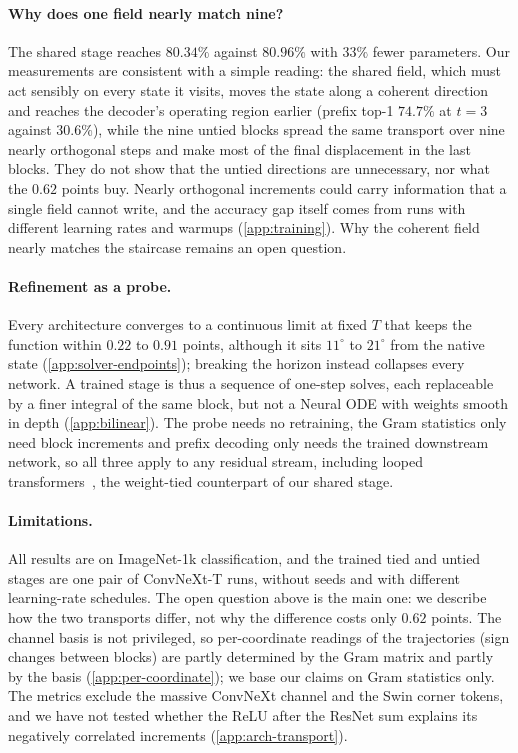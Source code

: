 \paragraph{Why does one field nearly match nine?}
The shared stage reaches $80.34\%$ against $80.96\%$ with $33\%$ fewer parameters.
Our measurements are consistent with a simple reading: the shared field, which must act
sensibly on every state it visits, moves the state along a coherent direction and
reaches the decoder's operating region earlier (prefix top-1 $74.7\%$ at $t{=}3$
against $30.6\%$), while the nine untied blocks spread the same transport over nine
nearly orthogonal steps and make most of the final displacement in the last blocks.
They do not show that the untied directions are unnecessary, nor what the $0.62$ points
buy.
Nearly orthogonal increments could carry information that a single field cannot
write, and the accuracy gap itself comes from runs with different learning rates and
warmups (\cref{app:training}).
Why the coherent field nearly matches the staircase remains an open question.

\paragraph{Refinement as a probe.}
Every architecture converges to a continuous limit at fixed $T$ that keeps the function
within $0.22$ to $0.91$ points, although it sits $11^\circ$ to $21^\circ$ from the native
state (\cref{app:solver-endpoints}); breaking the horizon instead collapses every
network.
A trained stage is thus a sequence of one-step solves, each replaceable by a finer
integral of the same block, but not a Neural ODE with weights smooth in depth
(\cref{app:bilinear}).
The probe needs no retraining, the Gram statistics only need block increments and prefix
decoding only needs the trained downstream network, so all three apply to any residual
stream, including looped transformers~\citep{dehghani2019universal,giannou2023looped},
the weight-tied counterpart of our shared stage.

\paragraph{Limitations.}
All results are on ImageNet-1k classification, and the trained tied and untied stages
are one pair of ConvNeXt-T runs, without seeds and with different learning-rate
schedules.
The open question above is the main one: we describe how the two transports differ,
not why the difference costs only $0.62$ points.
The channel basis is not privileged, so per-coordinate readings of the trajectories
(sign changes between blocks) are partly determined by the Gram matrix and partly by the
basis (\cref{app:per-coordinate}); we base our claims on Gram statistics only.
The metrics exclude the massive ConvNeXt channel and the Swin corner tokens, and we
have not tested whether the ReLU after the ResNet sum explains its negatively correlated
increments (\cref{app:arch-transport}).

